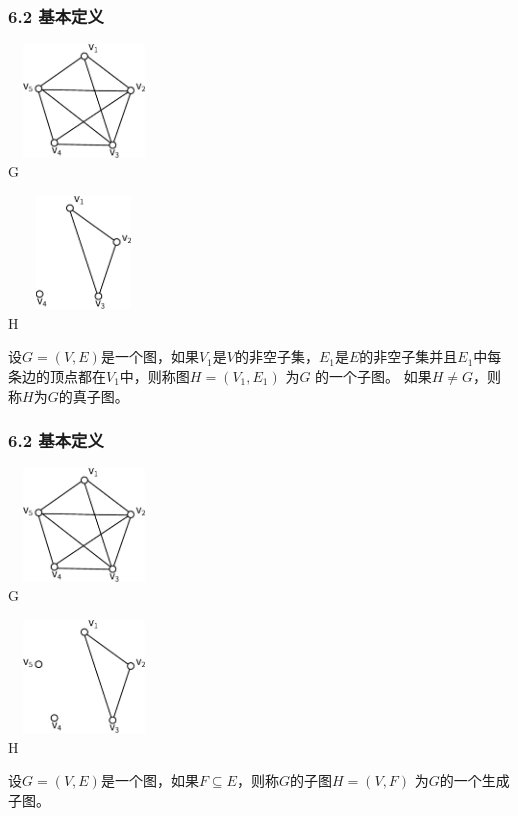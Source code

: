 \documentclass{beamer}
\begin{document}
\begin{CJK*}{UTF8}{gbsn}
\begin{frame}
  \frametitle{6.2 基本定义}
    \begin{minipage}[c]{0.4\textwidth}
\includegraphics[width=4cm,height=3cm]{subgraph1} \\ \centering G 
    \end{minipage}\hspace{2cm}
    \begin{minipage}[c]{0.4\textwidth}
\includegraphics[width=4cm,height=3cm]{subgraph2} \\ \centering H 
    \end{minipage}
    \pause
  \begin{definition6.2.6}
    设$G=(V,E)$是一个图，如果$V_1$是$V$的非空子集，$E_1$是$E$的非空子集并且$E_1$中每条边的顶点都在$V_1$中，则称图$H=(V_1,E_1)$ 为$G$ 的一个\alert{子图}。
如果$H \neq G$，则称$H$为$G$的\alert{真子图}。
  \end{definition6.2.6}
\end{frame}

\begin{frame}
  \frametitle{6.2 基本定义}
    \begin{minipage}[c]{0.4\textwidth}
\includegraphics[width=4cm,height=3cm]{subgraph1} \\ \centering G 
    \end{minipage}\hspace{2cm}
    \begin{minipage}[c]{0.4\textwidth}
\includegraphics[width=4cm,height=3cm]{spanning} \\ \centering H 
    \end{minipage}
    \pause
  \begin{definition6.2.7}
    设$G=(V,E)$是一个图，如果$F\subseteq E$，则称$G$的子图$H=(V,F)$ 为$G$的一个\alert{生成子图}。
  \end{definition6.2.7}
\end{frame}


\end{CJK*}
\end{document}
